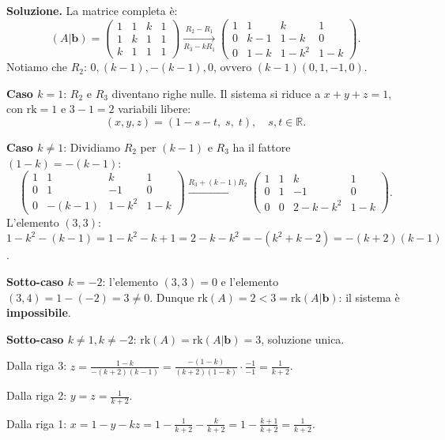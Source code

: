 \textbf{Soluzione.} La matrice completa è:
\[ (A|\mathbf{b}) = \left(\begin{array}{ccc|c} 1 & 1 & k & 1 \\ 1 & k & 1 & 1 \\ k & 1 & 1 & 1 \end{array}\right) \xrightarrow[\scriptscriptstyle R_3 - kR_1]{\scriptscriptstyle R_2 - R_1} \left(\begin{array}{ccc|c} 1 & 1 & k & 1 \\ 0 & k{-}1 & 1{-}k & 0 \\ 0 & 1{-}k & 1{-}k^2 & 1{-}k \end{array}\right). \]
Notiamo che $R_2$: $0, (k-1), -(k-1), 0$, ovvero $(k-1)(0, 1, -1, 0)$.

\textbf{Caso $k = 1$}: $R_2$ e $R_3$ diventano righe nulle. Il sistema si riduce a $x + y + z = 1$, con $\text{rk} = 1$ e $3 - 1 = 2$ variabili libere:
\[ (x, y, z) = (1 - s - t, \; s, \; t), \quad s, t \in \mathbb{R}. \]

\textbf{Caso $k \neq 1$}: Dividiamo $R_2$ per $(k-1)$ e $R_3$ ha il fattore $(1-k) = -(k-1)$:
\[ \left(\begin{array}{ccc|c} 1 & 1 & k & 1 \\ 0 & 1 & -1 & 0 \\ 0 & -(k{-}1) & 1{-}k^2 & 1{-}k \end{array}\right) \xrightarrow{\scriptscriptstyle R_3 + (k-1)R_2} \left(\begin{array}{ccc|c} 1 & 1 & k & 1 \\ 0 & 1 & -1 & 0 \\ 0 & 0 & 2{-}k{-}k^2 & 1{-}k \end{array}\right). \]
L'elemento $(3,3)$: $1-k^2-(k-1) = 1-k^2-k+1 = 2-k-k^2 = -(k^2+k-2) = -(k+2)(k-1)$.

\textbf{Sotto-caso $k = -2$}: l'elemento $(3,3) = 0$ e l'elemento $(3,4) = 1-(-2) = 3 \neq 0$. Dunque $\text{rk}(A) = 2 < 3 = \text{rk}(A|\mathbf{b})$: il sistema è \textbf{impossibile}.

\textbf{Sotto-caso $k \neq 1, k \neq -2$}: $\text{rk}(A) = \text{rk}(A|\mathbf{b}) = 3$, soluzione unica.

Dalla riga 3: $z = \frac{1-k}{-(k+2)(k-1)} = \frac{-(1-k)}{(k+2)(1-k)} \cdot \frac{-1}{-1} = \frac{1}{k+2}$.

Dalla riga 2: $y = z = \frac{1}{k+2}$.

Dalla riga 1: $x = 1 - y - kz = 1 - \frac{1}{k+2} - \frac{k}{k+2} = 1 - \frac{k+1}{k+2} = \frac{1}{k+2}$.

